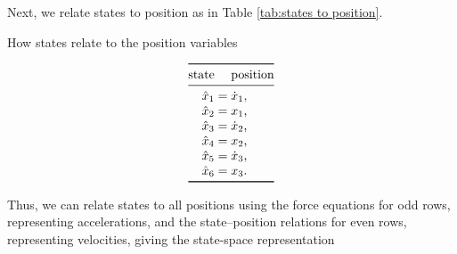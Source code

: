 \documentclass[12pt]{article}
\begin{document}
Next, we relate states to position as in Table \ref{tab:states to position}.

\begin{table}[h]
    \centering
    \caption{How states relate to the position variables}
    \[
        \begin{array}{@{}r@{}c@{}l@{}}
        \toprule
            \text{state} & & \text{position}
        \\*
        \midrule
            {\hat{x}}_1 &{}={}& \dot{x}_1\rlap,
        \\*
            {\hat{x}}_2 &{}={}& x_1\rlap,
        \\*
            {\hat{x}}_3 &{}={}& \dot{x}_2\rlap,
        \\*
            {\hat{x}}_4 &{}={}& x_2\rlap,
        \\*
            {\hat{x}}_5 &{}={}& \dot{x}_3\rlap,
        \\*
            {\hat{x}}_6 &{}={}& x_3\rlap.
        \\*
        \bottomrule
        \end{array}
    \]
    \label{tab:states to position}
\end{table}

Thus, we can relate states to all positions using
the force equations for odd rows, representing accelerations,
and the state--position relations for even rows, representing velocities,
giving the state-space representation
\end{document}
